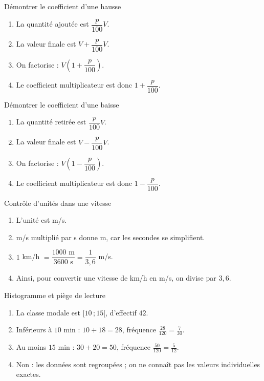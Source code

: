 \documentclass[11pt,a4paper]{article}
\newcommand{\classe}[2]{\ensuremath{[#1\,;#2[}}
\newcounter{corr}
\begin{document}
\begin{corrbox}{Démontrer le coefficient d'une hausse}
\begin{enumerate}
\item La quantité ajoutée est $\dfrac{p}{100}V$.
\item La valeur finale est $V+\dfrac{p}{100}V$.
\item On factorise : $V\left(1+\dfrac{p}{100}\right)$.
\item Le coefficient multiplicateur est donc $1+\dfrac{p}{100}$.
\end{enumerate}
\end{corrbox}

\begin{corrbox}{Démontrer le coefficient d'une baisse}
\begin{enumerate}
\item La quantité retirée est $\dfrac{p}{100}V$.
\item La valeur finale est $V-\dfrac{p}{100}V$.
\item On factorise : $V\left(1-\dfrac{p}{100}\right)$.
\item Le coefficient multiplicateur est donc $1-\dfrac{p}{100}$.
\end{enumerate}
\end{corrbox}

\begin{corrbox}{Contrôle d'unités dans une vitesse}
\begin{enumerate}
\item L'unité est m/s.
\item m/s multiplié par s donne m, car les secondes se simplifient.
\item $1$ km/h $=\dfrac{1000\text{ m}}{3600\text{ s}}=\dfrac1{3{,}6}$ m/s.
\item Ainsi, pour convertir une vitesse de km/h en m/s, on divise par $3{,}6$.
\end{enumerate}
\end{corrbox}

\begin{corrbox}{Histogramme et piège de lecture}
\begin{enumerate}
\item La classe modale est \classe{10}{15}, d'effectif $42$.
\item Inférieurs à $10$ min : $10+18=28$, fréquence $\frac{28}{120}=\frac{7}{30}$.
\item Au moins $15$ min : $30+20=50$, fréquence $\frac{50}{120}=\frac{5}{12}$.
\item Non : les données sont regroupées ; on ne connaît pas les valeurs individuelles exactes.
\end{enumerate}
\end{corrbox}
\end{document}

